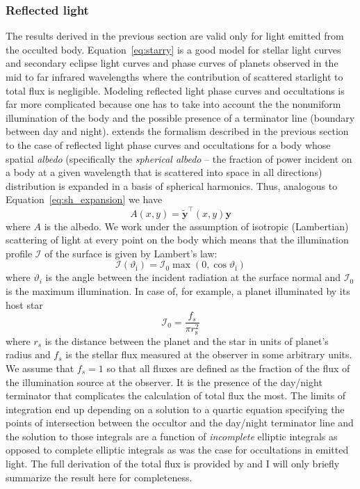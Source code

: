 \documentclass[12pt]{report}
\begin{document}
\subsubsection{Reflected light}
The results derived in the previous section are valid only for light emitted
from the occulted body. Equation~\ref{eq:starry} is a good model for stellar
light curves and secondary eclipse light curves and phase curves of planets
observed in the mid to far infrared wavelengths where the contribution of
scattered starlight to total flux is negligible. Modeling reflected light phase
curves and occultations is far more complicated because one has to take into
account the the nonuniform illumination of the body and the possible presence
of a terminator line (boundary between day and night).
\citet{2021arXiv210306275L} extends the formalism described in the previous
section to the case of reflected light phase curves and occultations for a body
whose spatial \emph{albedo} (specifically the \emph{spherical albedo} -- the
fraction of power incident on a body at a given wavelength that is scattered
into space in all directions) distribution is expanded in a basis of spherical
harmonics. Thus, analogous to Equation~\ref{eq:sh_expansion} we have
\begin{equation}
    A(x, y)=\tilde{\mathbf{y}}^{\top}(x, y) \mathbf{y}
\end{equation}
where $A$ is the albedo. We work under the assumption of isotropic (Lambertian)
scattering of light at every point on the body which means that the illumination
profile $\mathcal{I}$ of the surface is given by Lambert's law:
\begin{equation}
    \mathcal{I}\left(\vartheta_{\mathrm{i}}\right)=\mathcal{I}_{0} \max \left(0, \cos \vartheta_{\mathrm{i}}\right)
\end{equation}
where $\vartheta_i$ is the angle between the incident radiation at the surface normal
and $\mathcal{I}_0$ is the maximum illumination. In case of, for example, a planet illuminated
by its host star \citep[Appendix A.2 in][]{2021arXiv210306275L}
\begin{equation}
    \mathcal{I}_{0}=\frac{f_{s}}{\pi r_{\mathrm{s}}^{2}}
\end{equation}
where $r_s$ is the distance between the planet and the star in units of planet's radius
and $f_s$ is the stellar flux measured at the observer in some arbitrary units.
We assume that $f_s=1$ so that all fluxes are defined as the fraction of the flux
of the illumination source at the observer.
It is the presence of the day/night terminator that complicates the calculation
of total flux the most. The limits of integration end up depending on a
solution to a quartic equation specifying the points of intersection between
the occultor and the day/night terminator line and the solution to those
integrals are a function of \emph{incomplete} elliptic integrals as opposed to
complete elliptic integrals as was the case for occultations in emitted light.
The full derivation of the total flux is provided by \citet{2021arXiv210306275L} and
I will only briefly summarize  the result here for completeness.
\end{document}
